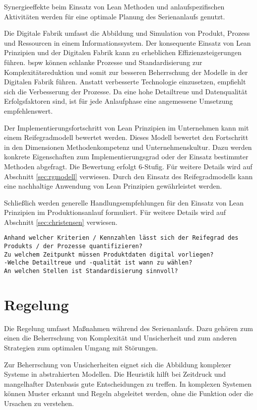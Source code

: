Synergieeffekte beim Einsatz von Lean Methoden und anlaufspezifischen Aktivitäten werden für eine optimale Planung des Serienanlaufs genutzt. 

Die Digitale Fabrik umfasst die Abbildung und Simulation von Produkt, Prozess und Ressourcen in einem Informationssystem. 
Der konsequente Einsatz von Lean Prinzipien und der Digitalen Fabrik kann zu erheblichen Effizienzsteigerungen führen. \Gls{bspw} können schlanke Prozesse und Standardisierung zur Komplexitätsreduktion und somit zur besseren Beherrschung der Modelle in der Digitalen Fabrik führen. Anstatt verbesserte Technologie einzusetzen, empfiehlt sich die Verbesserung der Prozesse. Da eine hohe Detailtreue und Datenqualität Erfolgsfaktoren sind, ist für jede Anlaufphase eine angemessene Umsetzung empfehlenswert. 

Der Implementierungsfortschritt von Lean Prinzipien im Unternehmen kann mit einem Reifegradmodell bewertet werden. Dieses Modell bewertet den Fortschritt in den Dimensionen Methodenkompetenz und Unternehmenskultur. Dazu werden konkrete Eigenschaften zum Implementierungsgrad oder der Einsatz bestimmter Methoden abgefragt. Die Bewertung erfolgt 6-Stufig. Für weitere Details wird auf Abschnitt \ref{sec:rgmodell} verwiesen. Durch den Einsatz des Reifegradmodells kann eine nachhaltige Anwendung von Lean Prinzipien gewährleistet werden. 

Schließlich werden generelle Handlungsempfehlungen für den Einsatz von Lean Prinzipien im Produktionsanlauf formuliert. Für weitere Details wird auf Abschnitt \ref{sec:christensen} verwiesen.

\begin{verbatim}
Anhand welcher Kriterien / Kennzahlen lässt sich der Reifegrad des 
Produkts / der Prozesse quantifizieren? 
Zu welchem Zeitpunkt müssen Produktdaten digital vorliegen? 
-Welche Detailtreue und -qualität ist wann zu wählen?
An welchen Stellen ist Standardisierung sinnvoll? 
\end{verbatim}

\section{Regelung}

Die Regelung umfasst Maßnahmen während des Serienanlaufs. Dazu gehören zum einen die Beherrschung von Komplexität und Unsicherheit und zum anderen Strategien zum optimalen Umgang mit Störungen. 

Zur Beherrschung von Unsicherheiten eignet sich die Abbildung komplexer Systeme in abstrahierten Modellen. Die Heuristik hilft bei Zeitdruck und mangelhafter Datenbasis gute Entscheidungen zu treffen. In komplexen Systemen können Muster erkannt und Regeln abgeleitet werden, ohne die Funktion oder die Ursachen zu verstehen. 

